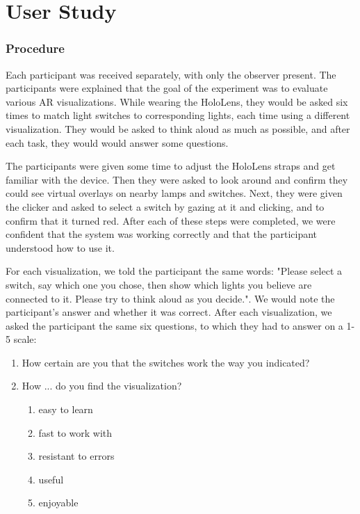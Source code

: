 \chapter{User Study} \label{chap:user}

\subsection{Procedure} \label{subsec:user:survey:procedure}
Each participant was received separately, with only the observer present. The participants were explained that the goal of the experiment was to evaluate various AR visualizations. While wearing the HoloLens, they would be asked six times to match light switches to corresponding lights, each time using a different visualization. They would be asked to think aloud as much as possible, and after each task, they would would answer some questions.

The participants were given some time to adjust the HoloLens straps and get familiar with the device. Then they were asked to look around and confirm they could see virtual overlays on nearby lamps and switches. Next, they were given the clicker and asked to select a switch by gazing at it and clicking, and to confirm that it turned red. After each of these steps were completed, we were confident that the system was working correctly and that the participant understood how to use it.

For each visualization, we told the participant the same words: "Please select a switch, say which one you chose, then show which lights you believe are connected to it. Please try to think aloud as you decide.". We would note the participant's answer and whether it was correct. After each visualization, we asked the participant the same six questions, to which they had to answer on a 1-5 scale:
\begin{enumerate}
  \item How certain are you that the switches work the way you indicated?
  \item How ... do you find the visualization?
  \begin{enumerate}
    \item easy to learn
    \item fast to work with
    \item resistant to errors
    \item useful
    \item enjoyable
  \end{enumerate}
\end{enumerate}


